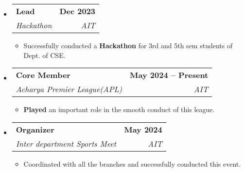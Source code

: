 \documentclass[letterpaper,11pt]{article}
\makeatletter
\newcommand{\resumeItem}[1]{
  \item\small{
    {#1 \vspace{-2pt}}
  }
}
\newcommand{\resumeSubheading}[4]{
  \vspace{-2pt}\item
    \begin{tabular*}{1.0\textwidth}[t]{l@{\extracolsep{\fill}}r}
      \textbf{#1} & \textbf{\small #2} \\
      \textit{\small#3} & \textit{\small #4} \\
    \end{tabular*}\vspace{-7pt}
}
\newcommand{\resumeSubHeadingListStart}{\begin{itemize}[leftmargin=0.0in, label={}]}
\newcommand{\resumeSubHeadingListEnd}{\end{itemize}}
\newcommand{\resumeItemListStart}{\begin{itemize}}
\newcommand{\resumeItemListEnd}{\end{itemize}\vspace{-5pt}}
\makeatother
\begin{document}
    \resumeSubHeadingListStart
        \resumeSubheading{Lead}{Dec 2023}{Hackathon}{AIT}
            \resumeItemListStart
            \vspace{4pt}
                \resumeItem{Successfully conducted a \textbf{Hackathon} for 3rd and 5th sem students of Dept. of CSE.}
            \resumeItemListEnd
            \vspace{5pt}
            
        \resumeSubheading{Core Member}{May 2024 -- Present}{Acharya Premier League(APL)}{AIT}
            \resumeItemListStart
            \vspace{4pt}
                \resumeItem{\textbf{Played} an important role in the smooth conduct of this league.}
                
            \resumeItemListEnd
            \vspace{5pt}

        \resumeSubheading{Organizer}{May 2024 }{Inter department Sports Meet}{AIT}
            \resumeItemListStart
            \vspace{4pt}
                \resumeItem{Coordinated with all the branches and successfully conducted this event.}
            \resumeItemListEnd

    \resumeSubHeadingListEnd
\end{document}
